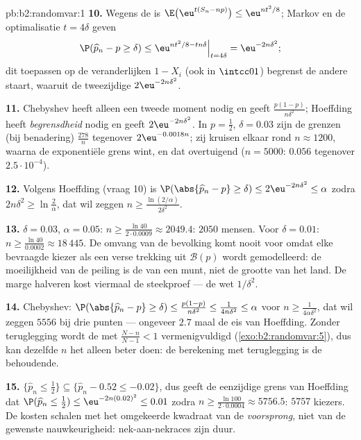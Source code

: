 \begin{solution}{pb:b2:randomvar:1}
\textbf{10.} Wegens de  is $\E\bigl(\eu^{t(S_n -
np)}\bigr) \leq \eu^{nt^2/8}$; Markov en de optimalisatie $t =
4\delta$ geven
\[
\P(\widehat p_n - p \geq \delta)
\leq \eu^{nt^2/8 - tn\delta}\Big|_{t = 4\delta}
= \eu^{-2n\delta^2};
\]
dit toepassen op de veranderlijken $1 - X_i$ (ook in $\intcc01$)
begrenst de andere staart, waaruit de tweezijdige
$2\eu^{-2n\delta^2}$.

\textbf{11.} Chebyshev heeft alleen een tweede moment nodig en
geeft $\frac{p(1-p)}{n\delta^2}$; Hoeffding heeft
\emph{begrensdheid} nodig en geeft $2\eu^{-2n\delta^2}$. In $p =
\frac12$, $\delta = 0.03$ zijn de grenzen (bij benadering)
$\frac{278}{n}$ tegenover $2\eu^{-0.0018n}$; zij kruisen elkaar
rond $n \approx 1200$, waarna de exponentiële grens wint, en dat
overtuigend ($n = 5000$: $0.056$ tegenover $2.5\cdot10^{-4}$).

\textbf{12.} Volgens Hoeffding (vraag 10) is $\P(\abs{\widehat p_n
- p} \geq \delta) \leq 2\eu^{-2n\delta^2} \leq \alpha$ zodra
$2n\delta^2 \geq \ln\frac2\alpha$, dat wil zeggen $n \geq
\frac{\ln(2/\alpha)}{2\delta^2}$.

\textbf{13.} $\delta = 0.03$, $\alpha = 0.05$: $n \geq \frac{\ln
40}{2\cdot0.0009} \approx 2049.4$: $2050$ mensen. Voor $\delta =
0.01$: $n \geq \frac{\ln40}{0.0002} \approx 18\,445$. De omvang van
de bevolking komt nooit voor omdat elke bevraagde kiezer als een
verse trekking uit $\mathcal B(p)$ wordt gemodelleerd: de
moeilijkheid van de peiling is de  van een munt, niet de
grootte van het land. De marge halveren kost viermaal de
steekproef --- de wet $1/\delta^2$.

\textbf{14.} Chebyshev: $\P(\abs{\widehat p_n - p} \geq \delta)
\leq \frac{p(1-p)}{n\delta^2} \leq \frac1{4n\delta^2} \leq \alpha$
voor $n \geq \frac1{4\alpha\delta^2}$, dat wil zeggen $5556$ bij
drie punten --- ongeveer $2.7$ maal de eis van Hoeffding. Zonder
teruglegging wordt de  met $\frac{N - n}{N-1} < 1$
vermenigvuldigd (\cref{exo:b2:randomvar:5}), dus kan dezelfde $n$
het alleen beter doen: de berekening met teruglegging is de
behoudende.

\textbf{15.} $\{\widehat p_n \leq \frac12\} \subseteq \{\widehat
p_n - 0.52 \leq -0.02\}$, dus geeft de eenzijdige grens van
Hoeffding dat $\P(\widehat p_n \leq \tfrac12) \leq
\eu^{-2n(0.02)^2} \leq 0.01$ zodra $n \geq \frac{\ln
100}{2\cdot0.0004} \approx 5756.5$: $5757$ kiezers. De kosten
schalen met het omgekeerde kwadraat van de \emph{voorsprong}, niet
van de gewenste nauwkeurigheid: nek-aan-nekraces zijn duur.


\end{solution}

